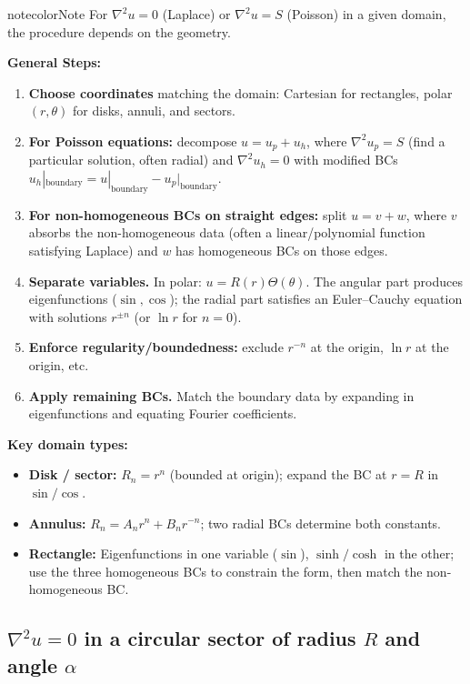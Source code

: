 \documentclass[a4paper,11pt]{article} %
\newenvironment{notebox}[1][]{\begin{custombox}[#1]{notecolor}{Note}}{\end{custombox}}
\begin{document}
\begin{notebox}[title={General Procedure: Laplace \& Poisson Equations}]
For $\nabla^2 u = 0$ (Laplace) or $\nabla^2 u = S$ (Poisson) in a given domain, the procedure depends on the geometry.

\textbf{General Steps:}
\begin{enumerate}
    \item \textbf{Choose coordinates} matching the domain: Cartesian for rectangles, polar $(r,\theta)$ for disks, annuli, and sectors.
    \item \textbf{For Poisson equations:} decompose $u = u_p + u_h$, where $\nabla^2 u_p = S$ (find a particular solution, often radial) and $\nabla^2 u_h = 0$ with modified BCs $u_h|_{\text{boundary}} = u|_{\text{boundary}} - u_p|_{\text{boundary}}$.
    \item \textbf{For non-homogeneous BCs on straight edges:} split $u = v + w$, where $v$ absorbs the non-homogeneous data (often a linear/polynomial function satisfying Laplace) and $w$ has homogeneous BCs on those edges.
    \item \textbf{Separate variables.} In polar: $u=R(r)\Theta(\theta)$. The angular part produces eigenfunctions ($\sin, \cos$); the radial part satisfies an Euler--Cauchy equation with solutions $r^{\pm n}$ (or $\ln r$ for $n=0$).
    \item \textbf{Enforce regularity/boundedness:} exclude $r^{-n}$ at the origin, $\ln r$ at the origin, etc.
    \item \textbf{Apply remaining BCs.} Match the boundary data by expanding in eigenfunctions and equating Fourier coefficients.
\end{enumerate}
\textbf{Key domain types:}
\begin{itemize}
    \item \textbf{Disk / sector:} $R_n = r^n$ (bounded at origin); expand the BC at $r=R$ in $\sin/\cos$.
    \item \textbf{Annulus:} $R_n = A_n r^n + B_n r^{-n}$; two radial BCs determine both constants.
    \item \textbf{Rectangle:} Eigenfunctions in one variable ($\sin$), $\sinh/\cosh$ in the other; use the three homogeneous BCs to constrain the form, then match the non-homogeneous BC.
\end{itemize}
\end{notebox}

\subsection{\texorpdfstring{$\nabla^2 u = 0$ in a circular sector of radius $R$ and angle $\alpha$}{Laplace in sector}}
\end{document}
